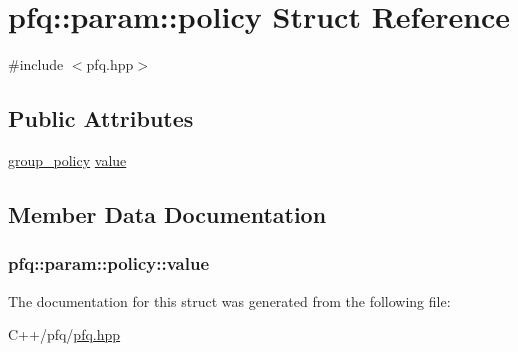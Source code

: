 \hypertarget{structpfq_1_1param_1_1policy}{}\section{pfq\+:\+:param\+:\+:policy Struct Reference}
\label{structpfq_1_1param_1_1policy}


{\ttfamily \#include $<$pfq.\+hpp$>$}

\subsection*{Public Attributes}
\begin{DoxyCompactItemize}
\item 
\hyperlink{namespacepfq_ac41249c8510558905b01fa4d866a38d7}{group\+\_\+policy} \hyperlink{structpfq_1_1param_1_1policy_ab0e84b461546b9e889dbe7b56ae39cdf}{value}
\end{DoxyCompactItemize}


\subsection{Member Data Documentation}
\subsubsection[{\texorpdfstring{value}{value}}]{ pfq\+::param\+::policy\+::value}\hypertarget{structpfq_1_1param_1_1policy_ab0e84b461546b9e889dbe7b56ae39cdf}{}\label{structpfq_1_1param_1_1policy_ab0e84b461546b9e889dbe7b56ae39cdf}


The documentation for this struct was generated from the following file\+:\begin{DoxyCompactItemize}
\item 
C++/pfq/\hyperlink{pfq_8hpp}{pfq.\+hpp}\end{DoxyCompactItemize}

